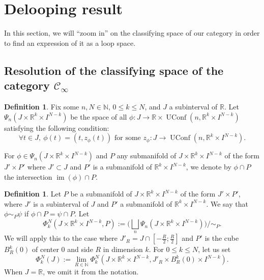 \documentclass[12pt]{amsart}
\theoremstyle{plain}
\theoremstyle{definition}
\newtheorem{defi}[teo]{Definition}
\theoremstyle{remark}
\DeclareMathOperator{\UConf}{UConf}
\DeclareMathOperator{\im}{im}
\newcommand{\C}{\mathcal{C}}
\begin{document}

\section{Delooping result}
In this section, we will ``zoom in'' on the classifying space of our category in order to find an expression of it as a loop space.

\subsection{Resolution of the classifying space of the category $\C_\infty$}

\begin{defi}\label{weirdtop}
    Fix some $n,N\in\mathbb{N}$, $0\leq k \leq N$, and $J$ a subinterval of $\mathbb{R}$. Let $\Psi_n(J\times \mathbb{R}^{k}\times I^{N-k})$ be the space of all $\phi : J \rightarrow \mathbb{R}\times \UConf(n,\mathbb{R}^{k}\times I^{N-k})$ satisfying the following condition:
    $$\forall t\in J,\ \phi(t) = (t, z_\phi(t)) \text{ for some } z_\phi:J \rightarrow \UConf(n,\mathbb{R}^{k}\times I^{N-k}).$$
    \end{defi}

  For $\phi\in \Psi_n(J\times \mathbb{R}^{k}\times I^{N-k})$ and $P$ any submanifold of $J\times\mathbb{R}^{k}\times I^{N-k}$ of the form $J'\times P'$ where $J'\subset J$ and $P'$ is a submanifold of $\mathbb{R}^{k}\times I^{N-k}$, we denote by $\phi\cap P$ the intersection $\im(\phi)\cap P$.
    \begin{defi}
    Let $P$ be a submanifold of $J\times\mathbb{R}^{k}\times I^{N-k}$ of the form $J'\times P'$, where $J'$ is a subinterval of $J$ and $P'$ a submanifold of $\mathbb{R}^{k}\times I^{N-k}$. 
    We say that $\phi\sim_P \psi$ if $\phi\cap P = \psi\cap P$.
    Let 
    \[\Phi_k^N(J\times\mathbb{R}^{k}\times I^{N-k},P) := \bigg( \displaystyle\bigsqcup_n \Psi_{n}(J\times\mathbb{R}^{k}\times I^{N-k})\bigg)/ \sim_P.\]
   We will apply this to the case where $J'_R = J\cap [-\frac R2;\frac R2]$ and $P'$ is the cube $B_R^{k}(0)$ of center 0 and side $R$ in dimension $k$.
    For $0\leq k\leq N$, let us set $$\Phi_{k}^{N}(J) := \lim_{R\in\mathbb{N}} \Phi_k^N(J\times\mathbb{R}^{k}\times I^{N-k}, J'_R\times B_R^{k}(0) \times I^{N-k}).$$
    When $J=\mathbb{R}$, we omit it from the notation.
    \end{defi}
    
\end{document}

